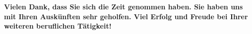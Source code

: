 \documentclass[a4paper,10pt]{article}
\begin{document}
{ %


\bigskip

\begin{flushleft}
\textbf{Vielen Dank, dass Sie sich die Zeit genommen haben. Sie haben uns mit Ihren Auskünften sehr geholfen. Viel Erfolg und Freude bei Ihrer weiteren beruflichen Tätigkeit!}
\end{flushleft}


\newpage
\quad


}
\end{document}
